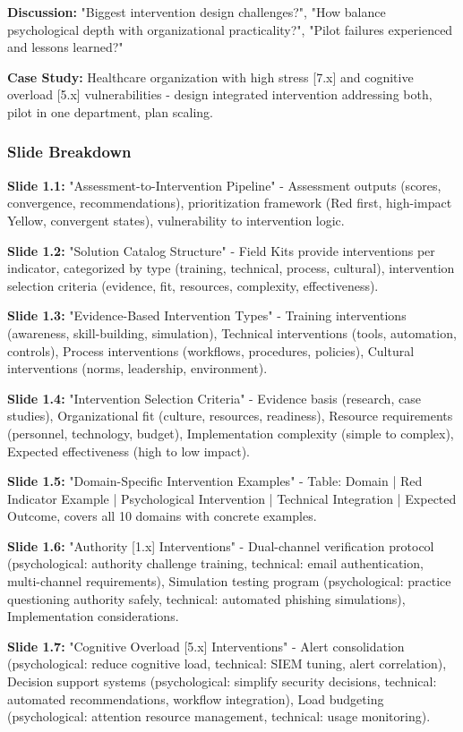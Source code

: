 \documentclass[11pt,a4paper]{article}
\begin{document}
\textbf{Discussion:} "Biggest intervention design challenges?", "How balance psychological depth with organizational practicality?", "Pilot failures experienced and lessons learned?"

\textbf{Case Study:} Healthcare organization with high stress [7.x] and cognitive overload [5.x] vulnerabilities - design integrated intervention addressing both, pilot in one department, plan scaling.

\subsubsection{Slide Breakdown}

\textbf{Slide 1.1:} "Assessment-to-Intervention Pipeline" - Assessment outputs (scores, convergence, recommendations), prioritization framework (Red first, high-impact Yellow, convergent states), vulnerability to intervention logic.

\textbf{Slide 1.2:} "Solution Catalog Structure" - Field Kits provide interventions per indicator, categorized by type (training, technical, process, cultural), intervention selection criteria (evidence, fit, resources, complexity, effectiveness).

\textbf{Slide 1.3:} "Evidence-Based Intervention Types" - Training interventions (awareness, skill-building, simulation), Technical interventions (tools, automation, controls), Process interventions (workflows, procedures, policies), Cultural interventions (norms, leadership, environment).

\textbf{Slide 1.4:} "Intervention Selection Criteria" - Evidence basis (research, case studies), Organizational fit (culture, resources, readiness), Resource requirements (personnel, technology, budget), Implementation complexity (simple to complex), Expected effectiveness (high to low impact).

\textbf{Slide 1.5:} "Domain-Specific Intervention Examples" - Table: Domain | Red Indicator Example | Psychological Intervention | Technical Integration | Expected Outcome, covers all 10 domains with concrete examples.

\textbf{Slide 1.6:} "Authority [1.x] Interventions" - Dual-channel verification protocol (psychological: authority challenge training, technical: email authentication, multi-channel requirements), Simulation testing program (psychological: practice questioning authority safely, technical: automated phishing simulations), Implementation considerations.

\textbf{Slide 1.7:} "Cognitive Overload [5.x] Interventions" - Alert consolidation (psychological: reduce cognitive load, technical: SIEM tuning, alert correlation), Decision support systems (psychological: simplify security decisions, technical: automated recommendations, workflow integration), Load budgeting (psychological: attention resource management, technical: usage monitoring).
\end{document}
